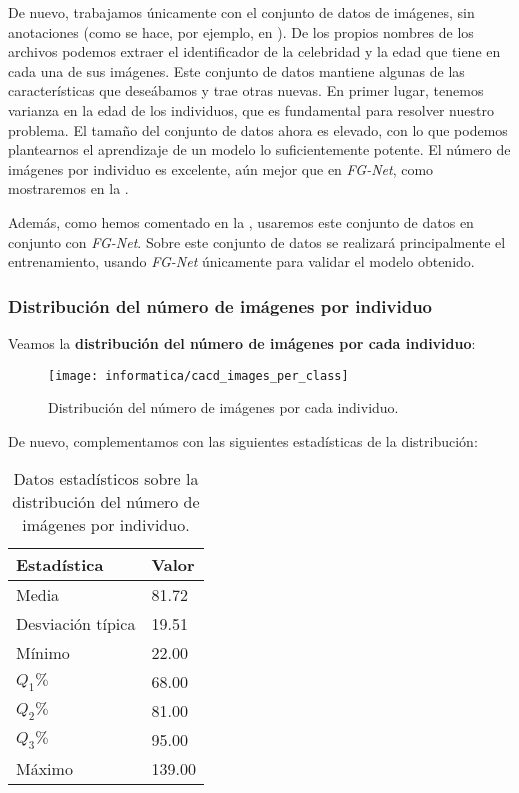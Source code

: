 De nuevo, trabajamos únicamente con el conjunto de datos de imágenes, sin anotaciones (como se hace, por ejemplo, en \cite{informatica:facenet}). De los propios nombres de los archivos podemos extraer el identificador de la celebridad y la edad que tiene en cada una de sus imágenes. Este conjunto de datos mantiene algunas de las características que deseábamos y trae otras nuevas.  En primer lugar, tenemos varianza en la edad de los individuos, que es fundamental para resolver nuestro problema. El tamaño del conjunto de datos ahora es elevado, con lo que podemos plantearnos el aprendizaje de un modelo lo suficientemente potente. El número de imágenes por individuo es excelente, aún mejor que en \textit{FG-Net}, como mostraremos en la .

Además, como hemos comentado en la , usaremos este conjunto de datos en conjunto con \textit{FG-Net}. Sobre este conjunto de datos se realizará principalmente el entrenamiento, usando \textit{FG-Net} únicamente para validar el modelo obtenido.

\subsubsection{Distribución del número de imágenes por individuo} \label{isubsubs:cacd_images_per_indv}

Veamos la \textbf{distribución del número de imágenes por cada individuo}:

\begin{figure}[!hbtp]
    \centering
    \texttt{[image: informatica/cacd\_images\_per\_class]}
    \caption{Distribución del número de imágenes por cada individuo.}
    \label{img:cacd_distr_images_per_class}
\end{figure}

De nuevo, complementamos con las siguientes estadísticas de la distribución:

\begin{table}[!hbtp]
\centering
\begin{tabular}{|l|l|}
    \hline
    \textbf{Estadística} & \textbf{Valor} \\
    \hline

    Media             & 81.72  \\
    Desviación típica & 19.51  \\
    Mínimo            & 22.00  \\
    $Q_1 \%$          & 68.00  \\
    $Q_2 \%$          & 81.00  \\
    $Q_3 \%$          & 95.00  \\
    Máximo            & 139.00 \\
    \hline

\end{tabular}
\caption{Datos estadísticos sobre la distribución del número de imágenes por individuo.}
\end{table}

